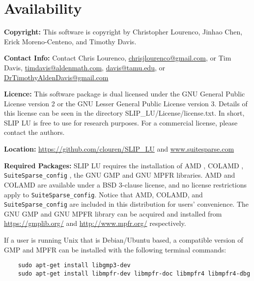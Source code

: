\documentclass[11pt]{article}
\theoremstyle{definition}
\begin{document}
\section{Availability}

\textbf{Copyright:} This software is copyright by Christopher Lourenco, Jinhao
Chen, Erick Moreno-Centeno, and Timothy Davis.

\noindent \textbf{Contact Info:} Contact Chris Lourenco,
\href{mailto:chrisjlourenco@gmail.com}{chrisjlourenco@gmail.com}, or Tim Davis,
\href{mailto:timdavis@aldenmath.com}{timdavis@aldenmath.com},
\href{mailto:davis@tamu.edu}{davis@tamu.edu}, or
\href{DrTimothyAldenDavis@gmail.com}{DrTimothyAldenDavis@gmail.com}

\noindent \textbf{Licence:} This software package is dual licensed under the
GNU General Public License version 2 or the GNU Lesser General Public License
version 3. Details of this license can be seen in the directory
SLIP\_LU/License/license.txt. In short, SLIP LU is free to use for research
purposes.  For a commercial license, please contact the authors.

\noindent \textbf{Location:} \url{https://github.com/clouren/SLIP_LU} and
\url{www.suitesparse.com}

\noindent \textbf{Required Packages:} SLIP LU requires the installation of AMD
\cite{amestoy1996approximate,amestoy2004algorithmamd}, COLAMD
\cite{davis2004column,davis2004algorithmcolamd}, \verb'SuiteSparse_config'
\cite{davis2014suitesparse}, the GNU GMP \cite{granlund2015gnu} and GNU MPFR
\cite{fousse2007mpfr} libraries.  AMD and COLAMD are available under a BSD
3-clause license, and no license restrictions apply to
\verb'SuiteSparse_config'.  Notice that AMD, COLAMD, and
\verb'SuiteSparse_config' are included in this distribution for users'
convenience. The GNU GMP and GNU MPFR library can be acquired and installed
from \url{https://gmplib.org/} and \url{http://www.mpfr.org/} respectively.

If a user is running Unix that is Debian/Ubuntu based, a compatible version of
GMP and MPFR can be installed with the following terminal commands:

{\small
\begin{verbatim}
    sudo apt-get install libgmp3-dev
    sudo apt-get install libmpfr-dev libmpfr-doc libmpfr4 libmpfr4-dbg
\end{verbatim}
}
\end{document}
